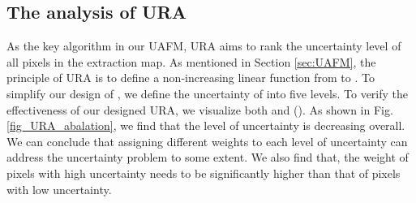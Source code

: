 \documentclass[lettersize,journal]{IEEEtran}
\begin{document}
\begin{figure*}
\centering
{}
\hfil
{}
\hfil
{}
\hfil
{}
\hfil
{}
\hfil
{}
\hfil
\caption{Visual examples of building extraction. The first row represents the visualizations of , and the second row represents the uncertainty visualization of .}
\label{fig_uafm_abalation}
\vspace{-0.5em}
\end{figure*}

\subsection{The analysis of URA}

\begin{figure*}
\centering
{}
\hfil
{}
\hfil
{}
\hfil
{}
\hfil
{}
\hfil
{}
\hfil
\caption{Visual examples of building extraction. The first row represents the visualizations of , and the second row represents the uncertainty visualization of .}
\label{fig_URA_abalation}
\vspace{-0.5em}
\end{figure*}

As the key algorithm in our UAFM, URA aims to rank the uncertainty level of all pixels in the extraction map. As mentioned in Section \ref{sec:UAFM}, the principle of URA is to define a non-increasing linear function  from  to . To simplify our design of , we define the uncertainty of  into five levels. To verify the effectiveness of our designed URA, we visualize both  and  (). As shown in Fig. \ref{fig_URA_abalation}, we find that the level of uncertainty is decreasing overall. We can conclude that assigning different weights to each level of uncertainty can address the uncertainty problem to some extent. We also find that, the weight of pixels with high uncertainty needs to be significantly higher than that of pixels with low uncertainty. 
\end{document}
